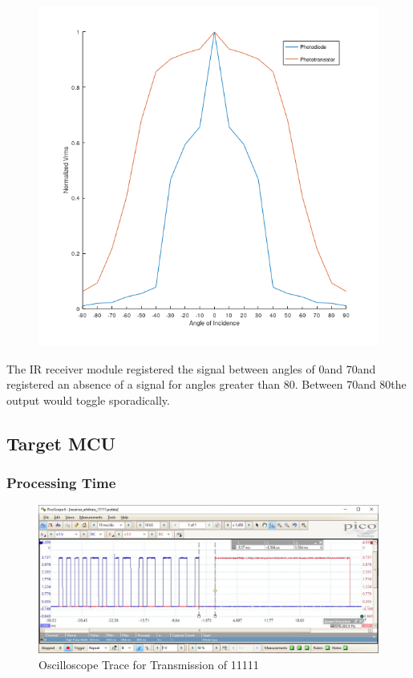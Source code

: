 \begin{figure}[H]
\begin{minipage}{.4\linewidth}
		\includegraphics[width=\textwidth]{figures/results/beam_pattern_square.png}
		\label{fig:beam_pattern}
	\end{minipage}
\end{figure}

The IR receiver module registered the signal between angles of 0\textdegree and 70\textdegree and registered an absence of a signal for angles greater than 80\textdegree. Between 70\textdegree and 80\textdegree the output would toggle sporadically.


\subsection{Target MCU}

\subsubsection{Processing Time}

\begin{figure}[H]
	\centering
	\includegraphics[width=.8\textwidth]{figures/results/receiver_software/arbitrary_11111_timing_test.JPG}
	\caption{Oscilloscope Trace for Transmission of 11111}
	\label{fig:arbitrary_11111_timing_test}
\end{figure}

